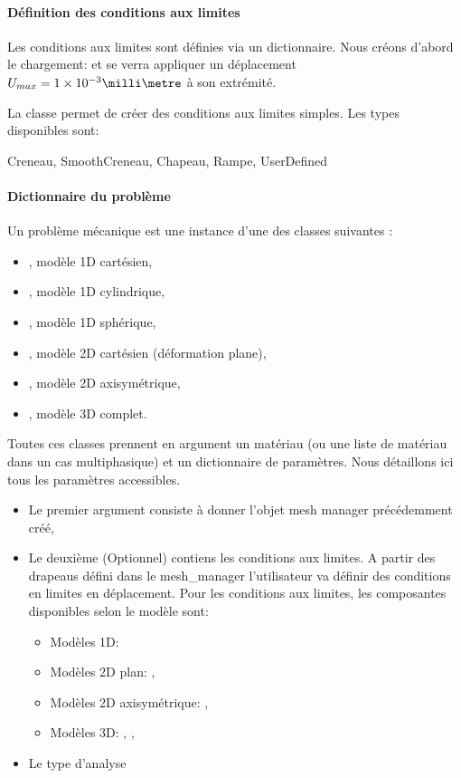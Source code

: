 \documentclass[10pt]{book}
\begin{document}
\paragraph{Définition des conditions aux limites} Les conditions aux limites sont définies via un dictionnaire. Nous créons d'abord le chargement:
 et se verra appliquer un déplacement $U_{max}=1 \times 10^{-3}\milli\metre$ à son extrémité.
\begin{figure}[h!]

\end{figure}

La classe  permet de créer des conditions aux limites simples. Les types disponibles sont:
\begin{center}
Creneau, SmoothCreneau, Chapeau, Rampe, UserDefined
\end{center}
\paragraph{Dictionnaire du problème} Un problème mécanique est une instance d'une des classes suivantes :
\begin{itemize}
\item {}, modèle 1D cartésien,
\item {}, modèle 1D cylindrique,
\item {}, modèle 1D sphérique,
\item {}, modèle 2D cartésien (déformation plane),
\item {}, modèle 2D axisymétrique,
\item {}, modèle 3D complet.
\end{itemize}
Toutes ces classes prennent en argument un matériau (ou une liste de matériau dans un cas multiphasique) et un dictionnaire de paramètres. Nous détaillons ici tous les paramètres accessibles.
\begin{itemize}
\item Le premier argument consiste à donner l'objet mesh manager précédemment créé,
\item Le deuxième (Optionnel) contiens les conditions aux limites. A partir des drapeaus défini dans le mesh_manager l'utilisateur va définir des conditions en limites en déplacement. Pour les conditions aux limites, les composantes disponibles selon le modèle sont:
\begin{itemize}
\item Modèles 1D: 
\item Modèles 2D plan: , 
\item Modèles 2D axisymétrique: , 
\item Modèles 3D: , , 
\end{itemize}
\item Le type d'analyse
\end{itemize}
\end{document}
